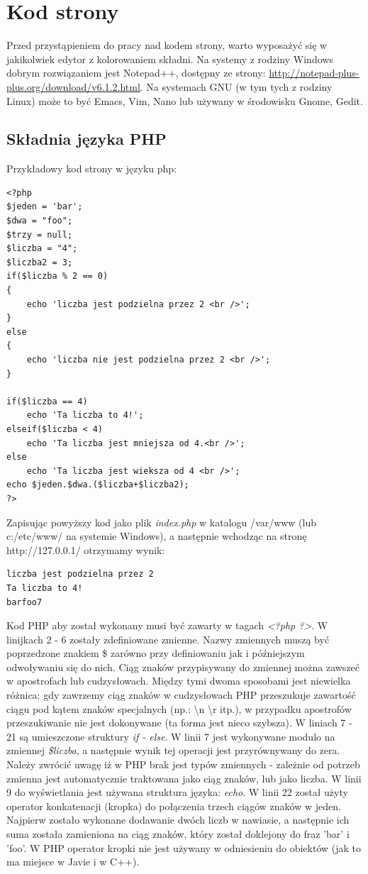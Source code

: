 \documentclass[a4paper,10pt]{article}
\begin{document}
\section{Kod strony}
Przed przystąpieniem do pracy nad kodem strony, warto wyposażyć się w jakikolwiek edytor z kolorowaniem składni. Na systemy z rodziny Windows dobrym rozwiązaniem jest Notepad++, dostępny ze strony: \href{http://notepad-plus-plus.org/download/v6.1.2.html}{http://notepad-plus-plus.org/download/v6.1.2.html}. Na systemach GNU (w tym tych z rodziny Linux) może to być Emacs, Vim, Nano lub używany w środowisku Gnome, Gedit.
\subsection{Składnia języka PHP}
Przykładowy kod strony w języku php: \\
\begin{verbatim}
<?php
$jeden = 'bar';
$dwa = "foo";
$trzy = null;
$liczba = "4";
$liczba2 = 3;
if($liczba % 2 == 0)
{
	echo 'liczba jest podzielna przez 2 <br />';
}
else
{
	echo 'liczba nie jest podzielna przez 2 <br />';
}

if($liczba == 4)
	echo 'Ta liczba to 4!';
elseif($liczba < 4)
	echo 'Ta liczba jest mniejsza od 4.<br />';
else
	echo 'Ta liczba jest wieksza od 4 <br />';
echo $jeden.$dwa.($liczba+$liczba2);
?>
\end{verbatim}
Zapisując powyższy kod jako plik \textit{index.php} w katalogu /var/www (lub c:/etc/www/ na systemie Windows), a następnie wchodząc na stronę http://127.0.0.1/ otrzymamy wynik:
\begin{verbatim}
liczba jest podzielna przez 2
Ta liczba to 4!
barfoo7
\end{verbatim}
Kod PHP aby został wykonany musi być zawarty w tagach \textit{<?php ?>}.
W linijkach 2 - 6 zostały zdefiniowane zmienne. Nazwy zmiennych muszą być poprzedzone znakiem \$ zarówno przy definiowaniu jak i późniejszym odwoływaniu się do nich. Ciąg znaków przypisywany do zmiennej można zawszeć w apostrofach lub cudzysłowach. Między tymi dwoma sposobami jest niewielka różnica: gdy zawrzemy ciąg znaków w cudzysłowach PHP przeszukuje zawartość ciągu pod kątem znaków specjalnych (np.: \textbackslash n \textbackslash r itp.), w przypadku apostrofów przeszukiwanie nie jest dokonywane (ta forma jest nieco szybsza). W liniach 7 - 21 są umieszczone struktury \textit{if - else}. W linii 7 jest wykonywane modulo na zmiennej \textit{\$liczba}, a następnie wynik tej operacji jest przyrównywany do zera. Należy zwrócić uwagę iż w PHP brak jest typów zmiennych - zależnie od potrzeb zmienna jest automatycznie traktowana jako ciąg znaków, lub jako liczba. W linii 9 do wyświetlania jest używana struktura języka: \textit{echo}. W linii 22 został użyty operator konkatenacji (kropka) do połączenia trzech ciągów znaków w jeden. Najpierw zostało wykonane dodawanie dwóch liczb w nawiasie, a następnie ich suma została zamieniona na ciąg znaków, który został doklejony do fraz 'bar' i 'foo'. W PHP operator kropki nie jest używany w odniesieniu do obiektów (jak to ma miejsce w Javie i w C++).
\end{document}

